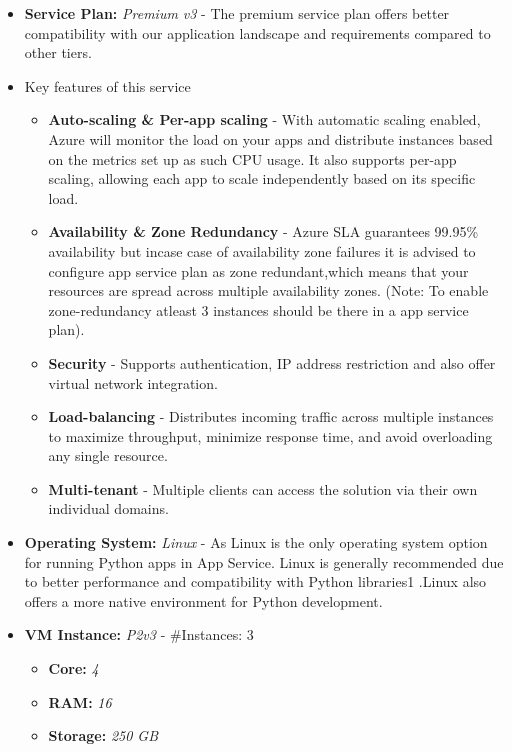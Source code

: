 \documentclass{llncs}
\begin{document}
\begin{itemize}
    \item \textbf{Service Plan:} \textit{Premium v3} - The premium service plan offers better compatibility with our application landscape and requirements compared to other tiers.
    \item Key features of this service
          \begin{itemize}
              \item \textbf{Auto-scaling \& Per-app scaling} - With automatic scaling enabled, Azure will monitor the load on your apps and distribute instances based on the metrics set up as such CPU usage. It also supports per-app scaling, allowing each app to scale independently based on its specific load.
              \item \textbf{Availability \& Zone Redundancy} - Azure SLA guarantees 99.95\% availability but incase case of availability zone failures it is advised to configure app service plan as zone redundant,which means that your resources are spread across multiple availability zones. (Note: To enable zone-redundancy atleast 3 instances should be there in a app service plan).
              \item \textbf{Security} - Supports authentication, IP address restriction and also offer virtual network integration.
              \item \textbf{Load-balancing} - Distributes incoming traffic across multiple instances to maximize throughput, minimize response time, and avoid overloading any single resource.
              \item \textbf{Multi-tenant} - Multiple clients can access the solution via their own individual domains.
          \end{itemize}

    \item \textbf{Operating System:} \textit{Linux} - As Linux is the only operating system option for running Python apps in App Service. Linux is generally recommended due to better performance and compatibility with Python libraries1
          .Linux also offers a more native environment for Python development\cite{azure-python}.

    \item \textbf{VM Instance:} \textit{P2v3} - \#Instances: 3

          \begin{itemize}
              \item \textbf{Core:} \textit{4}
              \item \textbf{RAM:} \textit{16}
              \item \textbf{Storage:} \textit{250 GB}
          \end{itemize}
\end{itemize}
\end{document}
